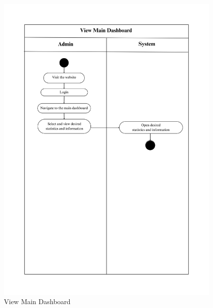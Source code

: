 \begin{figure}[h]
    \centering
    \includegraphics[width=1\textwidth]{Images/Activity Diagrams/12 View Main Dashboard.png}
    \caption{View Main Dashboard}
    \label{fig:activity-dashboard}
\end{figure}

